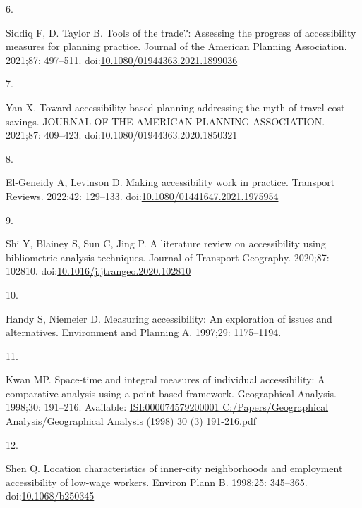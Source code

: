 \documentclass[10pt,letterpaper]{article}
\newlength{\cslhangindent}
\newlength{\csllabelwidth}
\newlength{\cslentryspacingunit} %
\newenvironment{CSLReferences}[2] %
 {%
  \setlength{\parindent}{0pt}
  \ifodd #1
  \let\oldpar\par
  \def\par{\hangindent=\cslhangindent\oldpar}
  \fi
  \setlength{\parskip}{#2\cslentryspacingunit}
 }%
 {}
\newcommand{\CSLLeftMargin}[1]{\parbox[t]{\csllabelwidth}{#1}}
\newcommand{\CSLRightInline}[1]{\parbox[t]{\linewidth - \csllabelwidth}{#1}\break}
\begin{document}
\begin{CSLReferences}{0}{0}
\leavevmode{}%
\CSLLeftMargin{6. }%
\CSLRightInline{Siddiq F, D. Taylor B. Tools of the trade?: Assessing
the progress of accessibility measures for planning practice. Journal of
the American Planning Association. 2021;87: 497--511.
doi:\href{https://doi.org/10.1080/01944363.2021.1899036}{10.1080/01944363.2021.1899036}}

\leavevmode{}%
\CSLLeftMargin{7. }%
\CSLRightInline{Yan X. Toward accessibility-based planning addressing
the myth of travel cost savings. {JOURNAL} {OF} {THE} {AMERICAN}
{PLANNING} {ASSOCIATION}. 2021;87: 409--423.
doi:\href{https://doi.org/10.1080/01944363.2020.1850321}{10.1080/01944363.2020.1850321}}

\leavevmode{}%
\CSLLeftMargin{8. }%
\CSLRightInline{El-Geneidy A, Levinson D. Making accessibility work in
practice. Transport Reviews. 2022;42: 129--133.
doi:\href{https://doi.org/10.1080/01441647.2021.1975954}{10.1080/01441647.2021.1975954}}

\leavevmode{}%
\CSLLeftMargin{9. }%
\CSLRightInline{Shi Y, Blainey S, Sun C, Jing P. A literature review on
accessibility using bibliometric analysis techniques. Journal of
Transport Geography. 2020;87: 102810.
doi:\href{https://doi.org/10.1016/j.jtrangeo.2020.102810}{10.1016/j.jtrangeo.2020.102810}}

\leavevmode{}%
\CSLLeftMargin{10. }%
\CSLRightInline{Handy S, Niemeier D. Measuring accessibility: An
exploration of issues and alternatives. Environment and Planning A.
1997;29: 1175--1194. }

\leavevmode{}%
\CSLLeftMargin{11. }%
\CSLRightInline{Kwan MP. Space-time and integral measures of individual
accessibility: A comparative analysis using a point-based framework.
Geographical Analysis. 1998;30: 191--216. Available:
\href{https://ISI:000074579200001\%0AC:/Papers/Geographical\%20Analysis/Geographical\%20Analysis\%20(1998)\%2030\%20(3)\%20191-216.pdf}{ISI:000074579200001
C:/Papers/Geographical Analysis/Geographical Analysis (1998) 30 (3)
191-216.pdf}}

\leavevmode{}%
\CSLLeftMargin{12. }%
\CSLRightInline{Shen Q. Location characteristics of inner-city
neighborhoods and employment accessibility of low-wage workers. Environ
Plann B. 1998;25: 345--365.
doi:\href{https://doi.org/10.1068/b250345}{10.1068/b250345}}


\end{CSLReferences}
\end{document}
